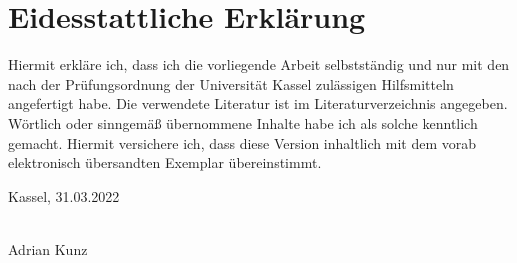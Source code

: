 \chapter*{Eidesstattliche Erklärung}


Hiermit erkläre ich, dass ich die vorliegende Arbeit selbstständig und nur mit den nach der Prüfungsordnung der Universität Kassel zulässigen Hilfsmitteln angefertigt habe.
Die verwendete Literatur ist im Literaturverzeichnis angegeben.
Wörtlich oder sinngemäß übernommene Inhalte habe ich als solche kenntlich gemacht.
Hiermit versichere ich, dass diese Version inhaltlich mit dem vorab elektronisch übersandten Exemplar übereinstimmt.

\vspace{1cm}

Kassel, 31.03.2022

\begin{flushright}
  \underline{\hspace{7cm}} \\
  Adrian Kunz
\end{flushright}
